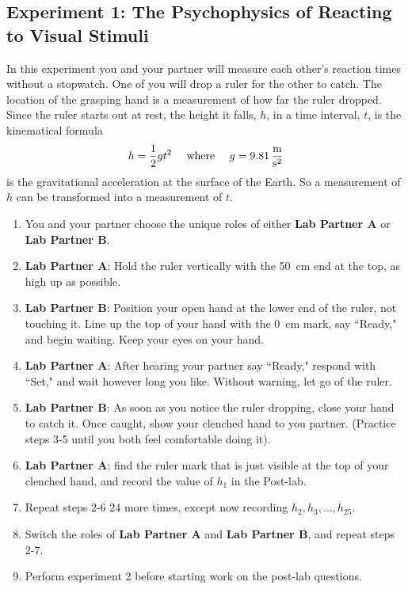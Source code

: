 \documentclass[addpoints]{physlabs}  %
\begin{document}
\begin{labsection}
\begin{experiment}
\subsection*{Experiment 1: The Psychophysics of Reacting to Visual Stimuli}
In this experiment you and your partner will measure each other's reaction times without a stopwatch.
One of you will drop a ruler for the other to catch.
The location of the grasping hand is a measurement of how far the ruler dropped.
Since the ruler starts out at rest, the height it falls, $h$, in a time interval, $t$, is the kinematical formula
\begin{align}
    h = \frac{1}{2}g t^2 \hspace{10pt}\text{  where  }\hspace{10pt} g = \qty{9.81}{\frac{\meter}{\second^2}}
\end{align}
is the gravitational acceleration at the surface of the Earth.
So a measurement of $h$ can be transformed into a measurement of $t$.
\begin{enumerate}
    \item You and your partner choose the unique roles of either \textbf{Lab Partner A} or \textbf{Lab Partner B}.
    \item \textbf{Lab Partner A}: Hold the ruler vertically with the \qty{50}{\centi\meter} end at the top, as high up as possible.
    \item \textbf{Lab Partner B}: Position your open hand at the lower end of the ruler, not touching it.
    Line up the top of your hand with the \qty{0}{\centi\meter} mark, say ``Ready," and begin waiting.
    Keep your eyes on your hand.
    \item \textbf{Lab Partner A}: After hearing your partner say ``Ready," respond with ``Set," and wait however long you like.
    Without warning, let go of the ruler.
    \item \textbf{Lab Partner B}: As soon as you notice the ruler dropping, close your hand to catch it.
    Once caught, show your clenched hand to you partner.
    (Practice steps 3-5 until you both feel comfortable doing it).
    \item \textbf{Lab Partner A}: find the ruler mark that is just visible at the top of your clenched hand, and record the value of $h_1$ in the Post-lab.
    \item Repeat steps 2-6 24 more times, except now recording $h_2, h_3,\dots, h_{25}$.
    \item Switch the roles of \textbf{Lab Partner A} and \textbf{Lab Partner B}, and repeat steps 2-7.
    \item Perform experiment 2 before starting work on the post-lab questions.
\end{enumerate}


\end{experiment}
\end{labsection}
\end{document}
